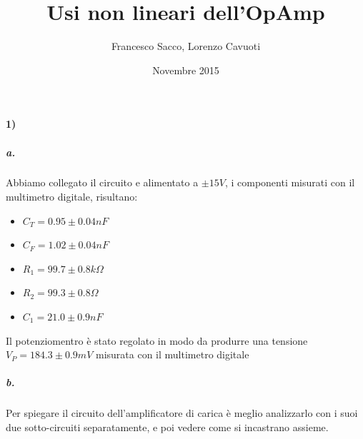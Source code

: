\documentclass{article}
\date{Novembre 2015}
\author{Francesco Sacco, Lorenzo Cavuoti}
\title{Usi non lineari dell'OpAmp}
\begin{document}
	\maketitle		
	\paragraph{1)}
	\subparagraph{a.}
		Abbiamo collegato il circuito e alimentato a $\pm 15V$, i componenti misurati con il multimetro digitale, risultano:
		\begin{itemize}
			\item $C_T=0.95\pm0.04 nF$
			\item $C_F=1.02\pm0.04 nF$
			\item $R_1=99.7\pm0.8 k\Omega$
			\item $R_2=99.3\pm0.8 \Omega$
			\item $C_1=21.0\pm0.9 nF$
		\end{itemize}
		Il potenziomentro è stato regolato in modo da produrre una tensione $V_P=184.3\pm0.9 mV$ misurata con il multimetro digitale

	\subparagraph{b.}
		Per spiegare il circuito dell'amplificatore di carica è meglio analizzarlo con i suoi due sotto-circuiti separatamente, e poi vedere come si incastrano assieme.\newline
\end{document}
